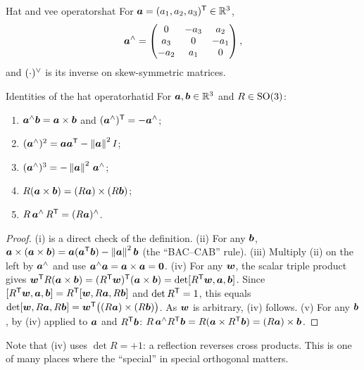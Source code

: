 \begin{definition}{Hat and vee operators}{hat}
For $\bm{a}=(a_1,a_2,a_3)^{\mathsf{T}}\in\mathbb{R}^3$,
\[
\bm{a}^{\wedge}=\begin{pmatrix}0&-a_3&a_2\\a_3&0&-a_1\\-a_2&a_1&0
\end{pmatrix},
\]
and $(\cdot)^{\vee}$ is its inverse on skew-symmetric matrices.
\end{definition}

\begin{lemma}{Identities of the hat operator}{hatid}
For $\bm{a},\bm{b}\in\mathbb{R}^3$ and $R\in\mathrm{SO}(3)$:
\begin{enumerate}[label=(\roman*),nosep]
\item $\bm{a}^{\wedge}\bm{b}=\bm{a}\times\bm{b}$ and
  $(\bm{a}^{\wedge})^{\mathsf{T}}=-\bm{a}^{\wedge}$;
\item $(\bm{a}^{\wedge})^2=\bm{a}\bm{a}^{\mathsf{T}}-\left\lVert \bm{a}\right\rVert^2I$;
\item $(\bm{a}^{\wedge})^3=-\left\lVert \bm{a}\right\rVert^2\,\bm{a}^{\wedge}$;
\item $R(\bm{a}\times\bm{b})=(R\bm{a})\times(R\bm{b})$;
\item $R\,\bm{a}^{\wedge}\,R^{\mathsf{T}}=(R\bm{a})^{\wedge}$.
\end{enumerate}
\end{lemma}

\begin{proof}
(i) is a direct check of the definition. (ii) For any $\bm{b}$,
$\bm{a}\times(\bm{a}\times\bm{b})=\bm{a}(\bm{a}^{\mathsf{T}}\bm{b})-
\left\lVert \bm{a}\right\rVert^2\bm{b}$ (the ``BAC--CAB'' rule). (iii) Multiply (ii)
on the left by $\bm{a}^{\wedge}$ and use $\bm{a}^{\wedge}\bm{a}=
\bm{a}\times\bm{a}=\bm{0}$. (iv) For any $\bm{w}$, the scalar
triple product gives
$\bm{w}^{\mathsf{T}} R(\bm{a}\times\bm{b})=(R^{\mathsf{T}}\bm{w})^{\mathsf{T}}(\bm{a}\times
\bm{b})=\det[R^{\mathsf{T}}\bm{w},\bm{a},\bm{b}]$. Since
$[R^{\mathsf{T}}\bm{w},\bm{a},\bm{b}]=R^{\mathsf{T}}[\bm{w},R\bm{a},R\bm{b}]$ and
$\det R^{\mathsf{T}}=1$, this equals $\det[\bm{w},R\bm{a},R\bm{b}]=
\bm{w}^{\mathsf{T}}\bigl((R\bm{a})\times(R\bm{b})\bigr)$. As $\bm{w}$ is
arbitrary, (iv) follows. (v) For any $\bm{b}$, by (iv) applied to
$\bm{a}$ and $R^{\mathsf{T}}\bm{b}$:
$R\,\bm{a}^{\wedge}R^{\mathsf{T}}\bm{b}=R(\bm{a}\times R^{\mathsf{T}}\bm{b})=
(R\bm{a})\times\bm{b}$.
\end{proof}

Note that (iv) uses $\det R=+1$: a reflection reverses cross products.
This is one of many places where the ``special'' in special orthogonal
matters.

